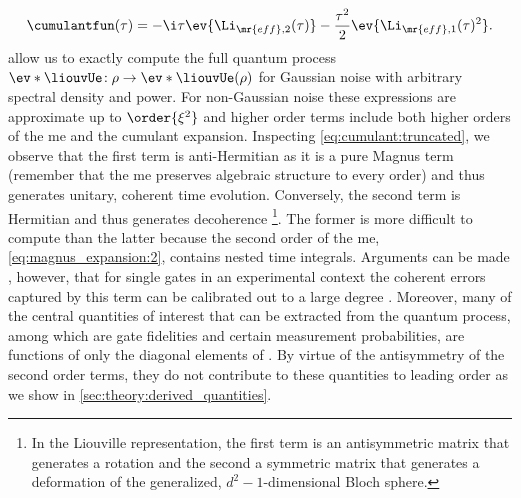 \begin{equation}
    \cumulantfun(\tau) = - \i\tau\ev{\Li_{\mr{eff},2}(\tau)} - \frac{\tau^2}{2}\ev{\Li_{\mr{eff},1}(\tau)^2}  \label{eq:cumulant:truncated}.
\end{equation}
 allow us to exactly compute the full quantum process $\ev*{\liouvUe}\!: \rho\rightarrow\ev*{\liouvUe(\rho)}$ for Gaussian noise with arbitrary spectral density and power. For non-Gaussian noise these expressions are approximate up to $\order{\xi^2}$ and higher order terms include both higher orders of the \gls{me} and the cumulant expansion. Inspecting \cref{eq:cumulant:truncated}, we observe that the first term is anti-Hermitian as it is a pure Magnus term (remember that the \gls{me} preserves algebraic structure to every order) and thus generates unitary, coherent time evolution. Conversely, the second term is Hermitian and thus generates decoherence \footnote{In the Liouville representation, the first term is an antisymmetric matrix that generates a rotation and the second a symmetric matrix that generates a deformation of the generalized, $d^2-1$-dimensional Bloch sphere.}. The former is more difficult to compute than the latter because the second order of the \gls{me}, \cref{eq:magnus_expansion:2}, contains nested time integrals. Arguments can be made \cite{Cerfontaine2021}, however, that for single gates in an experimental context the coherent errors captured by this term can be calibrated out to a large degree \cite{Cerfontaine2019gsc,Kimmel2015}. Moreover, many of the central quantities of interest that can be extracted from the quantum process, among which are gate fidelities and certain measurement probabilities, are functions of only the diagonal elements of \cumulantfun. By virtue of the antisymmetry of the second order terms, they do not contribute to these quantities to leading order as we show in \cref{sec:theory:derived_quantities}.

